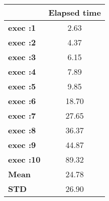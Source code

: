 \begin{tiny}\begin{tabular}{|l|c|}
\hline
&\textbf{Elapsed time}\\\hline
\textbf{exec :1}&2.63\\\hline
\textbf{exec :2}&4.37\\\hline
\textbf{exec :3}&6.15\\\hline
\textbf{exec :4}&7.89\\\hline
\textbf{exec :5}&9.85\\\hline
\textbf{exec :6}&18.70\\\hline
\textbf{exec :7}&27.65\\\hline
\textbf{exec :8}&36.37\\\hline
\textbf{exec :9}&44.87\\\hline
\textbf{exec :10}&89.32\\\hline
\textbf{ Mean}&24.78\\\hline
\textbf{ STD}&26.90\\\hline
\end{tabular}
\end{tiny}